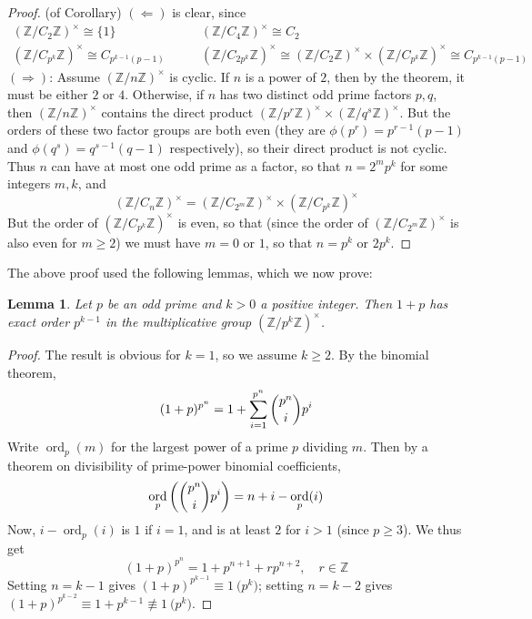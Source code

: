 \documentclass[12pt]{article}
\newcommand{\Ints}{\mathbb{Z}}
\DeclareMathOperator{\ord}{ord}
\newcommand{\UI}[1]{(\Ints/{#1}\Ints)^{\times}}
\newtheorem{lem}[thm]{Lemma}
\begin{document}
\begin{proof}(of Corollary)
\newline
$(\Leftarrow)$ is clear, since
\[
\begin{array}{ll}
  \UI{C_2} \cong\{1\}\quad&\quad\UI{C_4}\cong C_2\\
  \UI{C_{p^k}}\cong C_{p^{k-1}(p-1)}\quad&\quad \UI{C_{2p^k}}\cong\UI{C_2}\times\UI{C_{p^k}}\cong C_{p^{k-1}(p-1)}
\end{array}
\]
$(\Rightarrow)$: Assume $\UI{n}$ is cyclic. If $n$ is a power of $2$, then by the theorem, it must be either $2$ or $4$. Otherwise, if $n$ has two distinct odd prime factors $p,q$, then $\UI{n}$ contains the direct product $\UI{p^r}\times\UI{q^s}$. But the orders of these two factor groups are both even (they are $\phi(p^r)=p^{r-1}(p-1)$ and $\phi(q^s)=q^{s-1}(q-1)$ respectively), so their direct product is not cyclic. Thus $n$ can have at most one odd prime as a factor, so that $n=2^mp^k$ for some integers $m,k$, and
\[
  \UI{C_n} = \UI{C_{2^m}}\times\UI{C_{p^k}}
\]
But the order of $\UI{C_{p^k}}$ is even, so that (since the order of $\UI{C_{2^m}}$ is also even for $m\geq 2$) we must have $m=0$ or $1$, so that $n=p^k$ or $2p^k$.

\end{proof}
The above proof used the following lemmas, which we now prove:
\begin{lem} \label{lem:1pp} Let $p$ be an odd prime and $k>0$ a positive integer. Then $1+p$ has exact order $p^{k-1}$ in the multiplicative group $\UI{p^k}$.
\end{lem}
\begin{proof} The result is obvious for $k=1$, so we assume $k\geq 2$. By the binomial theorem,
\[
  (1+p)^{p^n} = 1+\sum_{i=1}^{p^n}\dbinom{p^n}{i}p^i
\]
Write $\ord_p(m)$ for the largest power of a prime $p$ dividing $m$. Then by a theorem on divisibility of prime-power binomial coefficients, 
\[
  \ord_p\left(\dbinom{p^n}{i}p^i\right) = n+i-\ord_p(i)
\]
Now, $i-\ord_p(i)$ is $1$ if $i=1$, and is at least $2$ for $i>1$ (since $p\geq 3$). We thus get
\[
  (1+p)^{p^n} = 1 + p^{n+1} + r p^{n+2},\quad r\in\Ints
\]
Setting $n=k-1$ gives $(1+p)^{p^{k-1}}\equiv 1\pod{p^{k}}$; setting $n=k-2$ gives $(1+p)^{p^{k-2}}\equiv 1+p^{k-1}\not\equiv 1\pod{p^{k}}$.
\end{proof}
\end{document}
